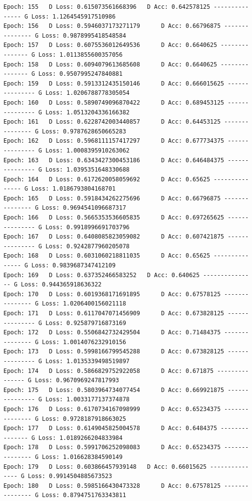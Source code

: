 \documentclass[11pt]{article}
\begin{document}
\begin{Verbatim}[commandchars=\\\{\}]
Epoch: 155 	 D Loss: 0.615073561668396 	 D Acc: 0.642578125 --------------- G Loss: 1.1264545917510986
Epoch: 156 	 D Loss: 0.5946037173271179 	 D Acc: 0.66796875 --------------- G Loss: 0.9878995418548584
Epoch: 157 	 D Loss: 0.6075536012649536 	 D Acc: 0.6640625 --------------- G Loss: 1.0113855600357056
Epoch: 158 	 D Loss: 0.6094079613685608 	 D Acc: 0.6640625 --------------- G Loss: 0.9507995247840881
Epoch: 159 	 D Loss: 0.5913312435150146 	 D Acc: 0.666015625 --------------- G Loss: 1.0206788778305054
Epoch: 160 	 D Loss: 0.5890749096870422 	 D Acc: 0.689453125 --------------- G Loss: 1.0513204336166382
Epoch: 161 	 D Loss: 0.6228742003440857 	 D Acc: 0.64453125 --------------- G Loss: 0.9787628650665283
Epoch: 162 	 D Loss: 0.5968111157417297 	 D Acc: 0.677734375 --------------- G Loss: 1.0008395910263062
Epoch: 163 	 D Loss: 0.6343427300453186 	 D Acc: 0.646484375 --------------- G Loss: 1.0395351648330688
Epoch: 164 	 D Loss: 0.6172620058059692 	 D Acc: 0.65625 --------------- G Loss: 1.0186793804168701
Epoch: 165 	 D Loss: 0.5918434262275696 	 D Acc: 0.66796875 --------------- G Loss: 0.9694541096687317
Epoch: 166 	 D Loss: 0.5665353536605835 	 D Acc: 0.697265625 --------------- G Loss: 0.9918996691703796
Epoch: 167 	 D Loss: 0.6408085823059082 	 D Acc: 0.607421875 --------------- G Loss: 0.9242877960205078
Epoch: 168 	 D Loss: 0.6031060218811035 	 D Acc: 0.65625 --------------- G Loss: 0.9839687347412109
Epoch: 169 	 D Loss: 0.637352466583252 	 D Acc: 0.640625 --------------- G Loss: 0.944365918636322
Epoch: 170 	 D Loss: 0.6019368171691895 	 D Acc: 0.67578125 --------------- G Loss: 1.0206400156021118
Epoch: 171 	 D Loss: 0.6117047071456909 	 D Acc: 0.673828125 --------------- G Loss: 0.925879716873169
Epoch: 172 	 D Loss: 0.5506842732429504 	 D Acc: 0.71484375 --------------- G Loss: 1.0014076232910156
Epoch: 173 	 D Loss: 0.5998166799545288 	 D Acc: 0.673828125 --------------- G Loss: 1.0135339498519897
Epoch: 174 	 D Loss: 0.5866829752922058 	 D Acc: 0.671875 --------------- G Loss: 0.9670969247817993
Epoch: 175 	 D Loss: 0.5803964734077454 	 D Acc: 0.669921875 --------------- G Loss: 1.0033177137374878
Epoch: 176 	 D Loss: 0.6170734167098999 	 D Acc: 0.65234375 --------------- G Loss: 0.9728187918663025
Epoch: 177 	 D Loss: 0.6149045825004578 	 D Acc: 0.6484375 --------------- G Loss: 1.0189266204833984
Epoch: 178 	 D Loss: 0.5991706252098083 	 D Acc: 0.65234375 --------------- G Loss: 1.016628384590149
Epoch: 179 	 D Loss: 0.603866457939148 	 D Acc: 0.66015625 --------------- G Loss: 0.9914504885673523
Epoch: 180 	 D Loss: 0.5985166430473328 	 D Acc: 0.67578125 --------------- G Loss: 0.8794751763343811

\end{Verbatim}
\end{document}
